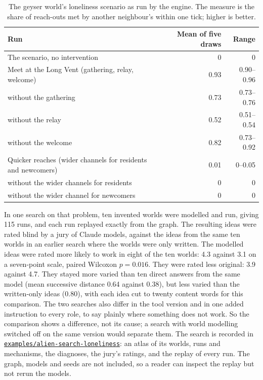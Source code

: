 \documentclass[11pt,a4paper]{article}
\begin{document}
\begin{table}[htbp]
\centering
\small
\begin{tabularx}{\textwidth}{@{}Yrr@{}}
\toprule
Run & Mean of five draws & Range \\
\midrule
The scenario, no intervention & 0 & 0 \\
Meet at the Long Vent (gathering, relay, welcome) & 0.93 & 0.90--0.96 \\
\quad without the gathering & 0.73 & 0.73--0.76 \\
\quad without the relay & 0.52 & 0.51--0.54 \\
\quad without the welcome & 0.82 & 0.73--0.92 \\
Quicker reaches (wider channels for residents and newcomers) & 0.01 & 0--0.05 \\
\quad without the wider channels for residents & 0 & 0 \\
\quad without the wider channel for newcomers & 0 & 0 \\
\bottomrule
\end{tabularx}
\caption{The geyser world's loneliness scenario as run by the engine. The measure
is the share of reach-outs met by another neighbour's within one tick; higher is
better.}
\label{tab:geyser-runs}
\end{table}

In one search on that problem, ten invented worlds were modelled and run, giving
115 runs, and each run replayed exactly from the graph. The resulting ideas were
rated blind by a jury of Claude models, against the ideas from the same ten worlds
in an earlier search where the worlds were only written. The modelled ideas were
rated more likely to work in eight of the ten worlds: 4.3 against 3.1 on a
seven-point scale, paired Wilcoxon $p = 0.016$. They were rated less original:
3.9 against 4.7. They stayed more varied than ten direct answers from the same
model (mean successive distance 0.64 against 0.38), but less varied than the
written-only ideas (0.80), with each idea cut to twenty content words for this
comparison. The two searches also differ in the tool version and in one added
instruction to every role, to say plainly where something does not work. So the
comparison shows a difference, not its cause; a search with world modelling
switched off on the same version would separate them. The search is recorded in
\href{https://github.com/emergent-wisdom/meaning-model/tree/v0.16.1/examples/alien-search-loneliness}{\texttt{examples/alien-search-loneliness}}:
an atlas of its worlds, runs and mechanisms, the diagnoses, the jury's ratings, and
the replay of every run. The graph, models and seeds are not included, so a reader
can inspect the replay but not rerun the models.
\end{document}
